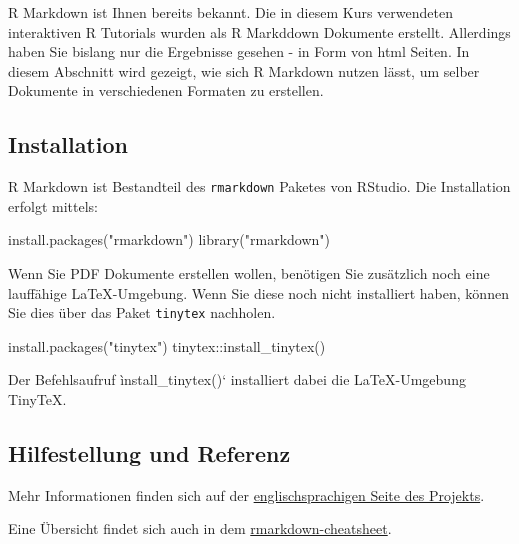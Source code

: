 \documentclass[
]{article}
\newenvironment{Shaded}{\begin{snugshade}}{\end{snugshade}}
\newcommand{\FunctionTok}[1]{\textcolor[rgb]{0.00,0.00,0.00}{#1}}
\newcommand{\NormalTok}[1]{#1}
\newcommand{\SpecialCharTok}[1]{\textcolor[rgb]{0.00,0.00,0.00}{#1}}
\newcommand{\StringTok}[1]{\textcolor[rgb]{0.31,0.60,0.02}{#1}}
\begin{document}
R Markdown ist Ihnen bereits bekannt. Die in diesem Kurs verwendeten
interaktiven R Tutorials wurden als R Markddown Dokumente erstellt.
Allerdings haben Sie bislang nur die Ergebnisse gesehen - in Form von
html Seiten. In diesem Abschnitt wird gezeigt, wie sich R Markdown
nutzen lässt, um selber Dokumente in verschiedenen Formaten zu
erstellen.

\hypertarget{installation}{%
\subsection{Installation}\label{installation}}

R Markdown ist Bestandteil des \texttt{rmarkdown} Paketes von RStudio.
Die Installation erfolgt mittels:

\begin{Shaded}
\begin{Highlighting}[]
\FunctionTok{install.packages}\NormalTok{(}\StringTok{"rmarkdown"}\NormalTok{) }
\FunctionTok{library}\NormalTok{(}\StringTok{"rmarkdown"}\NormalTok{)}
\end{Highlighting}
\end{Shaded}

Wenn Sie PDF Dokumente erstellen wollen, benötigen Sie zusätzlich noch
eine lauffähige LaTeX-Umgebung. Wenn Sie diese noch nicht installiert
haben, können Sie dies über das Paket \texttt{tinytex} nachholen.

\begin{Shaded}
\begin{Highlighting}[]
\FunctionTok{install.packages}\NormalTok{(}\StringTok{"tinytex"}\NormalTok{) }
\NormalTok{tinytex}\SpecialCharTok{::}\FunctionTok{install\_tinytex}\NormalTok{()}
\end{Highlighting}
\end{Shaded}

Der Befehlsaufruf ìnstall\_tinytex()` installiert dabei die
LaTeX-Umgebung TinyTeX.

\hypertarget{hilfestellung-und-referenz}{%
\subsection{Hilfestellung und
Referenz}\label{hilfestellung-und-referenz}}

Mehr Informationen finden sich auf der
\href{https://rmarkdown.rstudio.com}{englischsprachigen Seite des
Projekts}.

Eine Übersicht findet sich auch in dem
\href{https://github.com/rstudio/cheatsheets/raw/master/rmarkdown-2.0.pdf}{rmarkdown-cheatsheet}.
\end{document}
